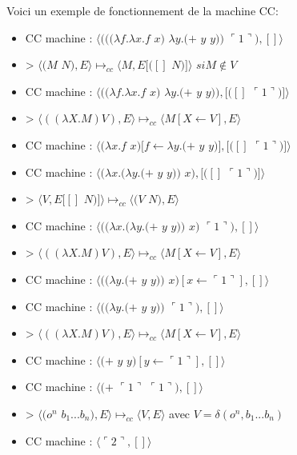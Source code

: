 \documentclass[10pt,a4paper]{article}
\begin{document}
					Voici un exemple de fonctionnement de la machine CC:
					
					\begin{itemize}
						\item[] CC machine : $\langle(((\lambda f.\lambda x.f$ $x)$ $\lambda y.(+$ $y$ $y))$ $\ulcorner 1\urcorner),[]\rangle$
						\item[] > $\langle(M$ $N),E\rangle \longmapsto_{cc} \langle M,E[([]$ $N)]\rangle$ $si M \notin V$
						\item[] CC machine : $\langle((\lambda f.\lambda x.f$ $x)$ $\lambda y.(+$ $y$ $y)),[([]$ $\ulcorner 1\urcorner)]\rangle$
						\item[] > $\langle((\lambda X.M) V),E\rangle \longmapsto_{cc} \langle M[X\longleftarrow V],E\rangle$
						\item[] CC machine : $\langle(\lambda x.f$ $x)[f \leftarrow \lambda y.(+$ $y$ $y)],[([]$ $\ulcorner 1\urcorner)]\rangle$
						\item[] CC machine : $\langle(\lambda x.(\lambda y.(+$ $y$ $y))$ $x),[([]$ $\ulcorner 1\urcorner)]\rangle$
						\item[] > $\langle V,E[[]$ $N)]\rangle \longmapsto_{cc} \langle(V$ $N),E\rangle$ 
						\item[] CC machine : $\langle((\lambda x.(\lambda y.(+$ $y$ $y))$ $x)$ $\ulcorner 1\urcorner),[]\rangle$
						\item[] > $\langle((\lambda X.M) V),E\rangle \longmapsto_{cc} \langle M[X\longleftarrow V],E\rangle$
						\item[] CC machine : $\langle((\lambda y.(+$ $y$ $y))$ $x)[x \leftarrow \ulcorner 1\urcorner],[]\rangle$
						\item[] CC machine : $\langle((\lambda y.(+$ $y$ $y))$ $\ulcorner 1\urcorner),[]\rangle$
						\item[] > $\langle((\lambda X.M) V),E\rangle \longmapsto_{cc} \langle M[X\longleftarrow V],E\rangle$
						\item[] CC machine : $\langle(+$ $y$ $y)[y \leftarrow \ulcorner 1\urcorner],[]\rangle$
						\item[] CC machine : $\langle(+$ $\ulcorner 1\urcorner$ $\ulcorner 1\urcorner),[]\rangle$
						\item[] > $\langle(o^{n}$ $b_{1}...b_{n}),E\rangle \longmapsto_{cc}  \langle V,E\rangle$ avec $V = \delta(o^{n},b_{1}...b_{n})$
						\item[] CC machine : $\langle\ulcorner 2\urcorner,[]\rangle$
					\end{itemize}
				
\end{document}
